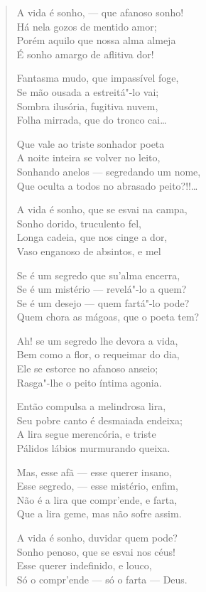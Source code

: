 \begin{verse}
A vida é sonho, --- que afanoso sonho!\\
Há nela gozos de mentido amor;\\
Porém aquilo que nossa alma almeja\\
É sonho amargo de aflitiva dor!

Fantasma mudo, que impassível foge,\\
Se mão ousada a estreitá"-lo vai;\\
Sombra ilusória, fugitiva nuvem,\\
Folha mirrada, que do tronco cai\ldots{}

Que vale ao triste sonhador poeta\\
A noite inteira se volver no leito,\\
Sonhando anelos --- segredando um nome,\\
Que oculta a todos no abrasado peito?!!\ldots{}

A vida é sonho, que se esvai na campa,\\
Sonho dorido, truculento fel,\\
Longa cadeia, que nos cinge a dor,\\
Vaso enganoso de absintos, e mel

Se é um segredo que su'alma encerra,\\
Se é um mistério --- revelá"-lo a quem?\\
Se é um desejo --- quem fartá"-lo pode?\\
Quem chora as mágoas, que o poeta tem?

Ah! se um segredo lhe devora a vida,\\
Bem como a flor, o requeimar do dia,\\
Ele se estorce no afanoso anseio;\\
Rasga"-lhe o peito íntima agonia.

Então compulsa a melindrosa lira,\\
Seu pobre canto é desmaiada endeixa;\\
A lira segue merencória, e triste\\
Pálidos lábios murmurando queixa.

Mas, esse afã --- esse querer insano,\\
Esse segredo, --- esse mistério, enfim,\\
Não é a lira que compr'ende, e farta,\\
Que a lira geme, mas não sofre assim.

A vida é sonho, duvidar quem pode?\\
Sonho penoso, que se esvai nos céus!\\
Esse querer indefinido, e louco,\\
Só o compr'ende --- só o farta --- Deus.
\end{verse}

